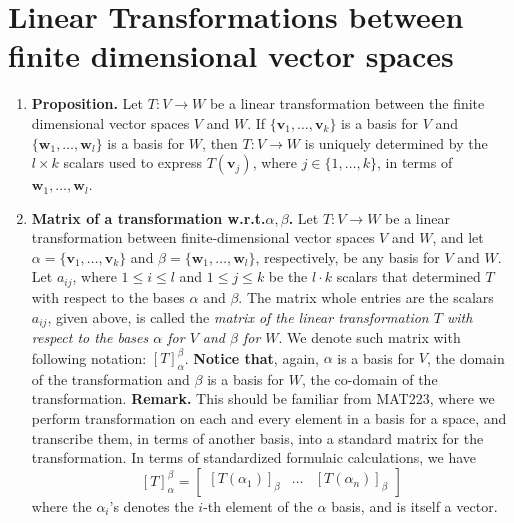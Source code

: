 \documentclass[oneside, 12pt]{book}
\newcommand{\settag}[1]{\renewcommand{\theenumi}{#1}}
\newcommand{\tbf}[1]{\textbf{#1}}
\newcommand{\tit}[1]{\textit{#1}}
\begin{document}
\section{Linear Transformations between finite dimensional vector spaces}
    \begin{enumerate}
        \settag{2.2.1}
        \item \tbf{Proposition.} Let $T:V\xrightarrow{}W$ be a linear transformation between the finite dimensional vector spaces $V$ and $W$. If $\{\mathbf{v}_1,\ldots,\mathbf{v}_k\}$ is a basis for $V$ and $\{\mathbf{w}_1,\ldots,\mathbf{w}_l\}$ is a basis for $W$, then $T:V\xrightarrow{}W$ is uniquely determined by the $l\times k$ scalars used to express $T(\mathbf{v}_j)$, where $j\in \{1,\ldots,k\}$, in terms of $\mathbf{w}_1,\ldots,\mathbf{w}_l$.
        
        \settag{2.2.6}
        \item \tbf{Matrix of a transformation w.r.t.$\alpha,\beta$.} Let $T:V\xrightarrow{}W$ be a linear transformation
         between finite-dimensional vector spaces $V$ and $W$, and let $\alpha = \{\mathbf{v}_1,\ldots,\mathbf{v}_k \}$ 
         and $\beta = \{\mathbf{w}_1,\ldots,\mathbf{w}_l\}$, respectively, be any basis for $V$ and $W$. 
        Let $a_{ij}$, where $1\leq i \leq l$ and $1\leq j \leq k$ be the $l\cdot k$ scalars that determined $T$ 
        with respect to the bases $\alpha$ and $\beta$. The matrix whole entries are the scalars $a_{ij}$, given above,
         is called the \tit{matrix of the linear transformation $T$ with respect to the bases $\alpha$ for $V$ and 
         $\beta$ for $W$}. We denote such matrix with following notation: $\left[T\right]^\beta_\alpha$. \newline 
        \tbf{Notice that}, again, $\alpha$ is a basis for $V$, the domain of the transformation and $\beta$ is a
         basis for $W$, the co-domain of the transformation.
        \newline
        \tbf{Remark.} This should be familiar from MAT223, where we perform transformation on each and every element 
        in a basis for a space, and transcribe them, in terms of another basis, into a standard matrix for the transformation. 
        In terms of standardized formulaic calculations, we have
        \begin{equation*}
            \left[T\right]_\alpha^\beta =
            \begin{bmatrix}
                \left[T(\alpha_1) \right]_\beta & \ldots & \left[T(\alpha_n) \right]_\beta
            \end{bmatrix}
        \end{equation*}
        where the $\alpha_i$'s denotes the $i$-th element of the $\alpha$ basis, and is itself a vector.
        

\end{enumerate}
\end{document}
